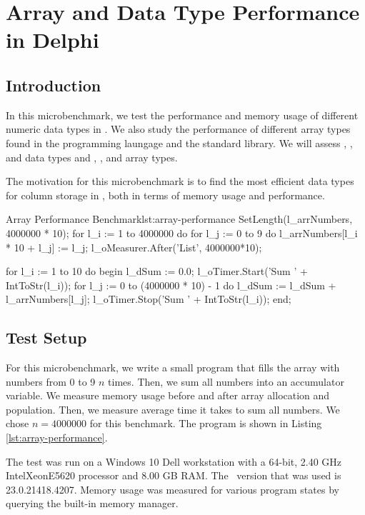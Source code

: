 \chapter{Array and Data Type Performance in Delphi}
\label{app:array-performance}

\section{Introduction}
\label{sec:Introduction}
In this microbenchmark, we test the performance and memory usage of different numeric data types in \delphi. We also study the performance of different array types found in the programming laungage and the standard library. We will assess , , and  data types and , , and  array types.

The motivation for this microbenchmark is to find the most efficient data types for column storage in \gap, both in terms of memory usage and performance.

\begin{delphicode}{Array Performance Benchmark}{lst:array-performance}
  SetLength(l_arrNumbers, 4000000 * 10);
  for l_i := 1 to 4000000 do
    for l_j := 0 to 9 do
      l_arrNumbers[l_i * 10 + l_j] := l_j;
  l_oMeasurer.After('List', 4000000*10);

  for l_i := 1 to 10 do
  begin
    l_dSum := 0.0;
    l_oTimer.Start('Sum ' + IntToStr(l_i));
    for l_j := 0 to (4000000 * 10) - 1 do
      l_dSum := l_dSum + l_arrNumbers[l_j];
    l_oTimer.Stop('Sum ' + IntToStr(l_i));
  end;
\end{delphicode}
\section{Test Setup}
\label{sec:Test Setup}
For this microbenchmark, we write a small program that fills the array with numbers from 0 to 9 $n$ times. Then, we sum all numbers into an accumulator variable. We measure memory usage before and after array allocation and population. Then, we measure average time it takes to sum all numbers. We chose $n = 4000000$ for this benchmark. The program is shown in Listing \ref{lst:array-performance}.

The test was run on a Windows 10 Dell workstation with a 64-bit, 2.40 GHz Intel\textregistered Xeon\textregistered E5620 processor and 8.00 GB RAM. The \delphi~version that was used is 23.0.21418.4207. Memory usage was measured for various program states by querying the built-in  memory manager.

